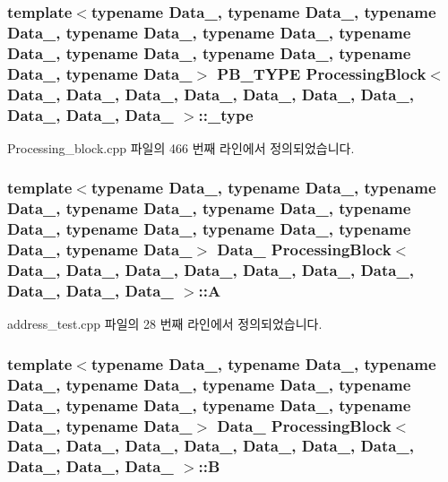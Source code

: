 \subsubsection[{\texorpdfstring{\+\_\+type}{_type}}]{\setlength{\rightskip}{0pt plus 5cm}template$<$typename Data\+\_, typename Data\+\_, typename Data\+\_, typename Data\+\_, typename Data\+\_, typename Data\+\_, typename Data\+\_, typename Data\+\_, typename Data\+\_, typename Data\+\_$>$ {\bf P\+B\+\_\+\+T\+Y\+PE} {\bf Processing\+Block}$<$ Data\+\_, Data\+\_, Data\+\_, Data\+\_, Data\+\_, Data\+\_, Data\+\_, Data\+\_, Data\+\_, Data\+\_ $>$\+::\+\_\+type\hspace{0.3cm}{\ttfamily [private]}}\hypertarget{classProcessingBlock_a8e6d7304fe7a12682a5ca144e942d632}{}\label{classProcessingBlock_a8e6d7304fe7a12682a5ca144e942d632}


Processing\+\_\+block.\+cpp 파일의 466 번째 라인에서 정의되었습니다.

\subsubsection[{\texorpdfstring{A}{A}}]{\setlength{\rightskip}{0pt plus 5cm}template$<$typename Data\+\_, typename Data\+\_, typename Data\+\_, typename Data\+\_, typename Data\+\_, typename Data\+\_, typename Data\+\_, typename Data\+\_, typename Data\+\_, typename Data\+\_$>$ Data\+\_ {\bf Processing\+Block}$<$ Data\+\_, Data\+\_, Data\+\_, Data\+\_, Data\+\_, Data\+\_, Data\+\_, Data\+\_, Data\+\_, Data\+\_ $>$\+::A}\hypertarget{classProcessingBlock_a25b19325d824b725a2763f223c3270a4}{}\label{classProcessingBlock_a25b19325d824b725a2763f223c3270a4}


address\+\_\+test.\+cpp 파일의 28 번째 라인에서 정의되었습니다.

\subsubsection[{\texorpdfstring{B}{B}}]{\setlength{\rightskip}{0pt plus 5cm}template$<$typename Data\+\_, typename Data\+\_, typename Data\+\_, typename Data\+\_, typename Data\+\_, typename Data\+\_, typename Data\+\_, typename Data\+\_, typename Data\+\_, typename Data\+\_$>$ Data\+\_ {\bf Processing\+Block}$<$ Data\+\_, Data\+\_, Data\+\_, Data\+\_, Data\+\_, Data\+\_, Data\+\_, Data\+\_, Data\+\_, Data\+\_ $>$\+::B}\hypertarget{classProcessingBlock_a4d2343458c1ebfd02d744661f2898a42}{}\label{classProcessingBlock_a4d2343458c1ebfd02d744661f2898a42}


